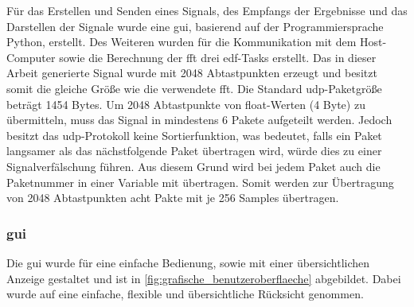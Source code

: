 \documentclass[../EDF Master Thesis.tex]{subfiles}
\begin{document}
        Für das Erstellen und Senden eines Signals, des Empfangs der Ergebnisse und das Darstellen der Signale wurde eine \ac{gui}, basierend auf der Programmiersprache Python, erstellt.
        Des Weiteren wurden für die Kommunikation mit dem Host-Computer sowie die Berechnung der \ac{fft} drei \ac{edf}-Tasks erstellt.
        Das in dieser Arbeit generierte Signal wurde mit 2048 Abtastpunkten erzeugt und besitzt somit die gleiche Größe wie die verwendete \ac{fft}.
        Die Standard \ac{udp}-Paketgröße beträgt 1454 Bytes.
        Um 2048 Abtastpunkte von float-Werten (4 Byte) zu übermitteln, muss das Signal in mindestens 6 Pakete aufgeteilt werden.
        Jedoch besitzt das \ac{udp}-Protokoll keine Sortierfunktion, was bedeutet, falls ein Paket langsamer als das nächstfolgende Paket übertragen wird, würde dies zu einer Signalverfälschung führen.
        Aus diesem Grund wird bei jedem Paket auch die Paketnummer in einer Variable mit übertragen.
        Somit werden zur Übertragung von 2048 Abtastpunkten acht Pakte mit je 256 Samples übertragen.

        \clearpage

        \subsubsection{\acf{gui}}
            Die \ac{gui} wurde für eine einfache Bedienung, sowie mit einer übersichtlichen Anzeige gestaltet und ist in \autoref{fig:grafische_benutzeroberflaeche} abgebildet.
            Dabei wurde auf eine einfache, flexible und übersichtliche Rücksicht genommen.
\end{document}
